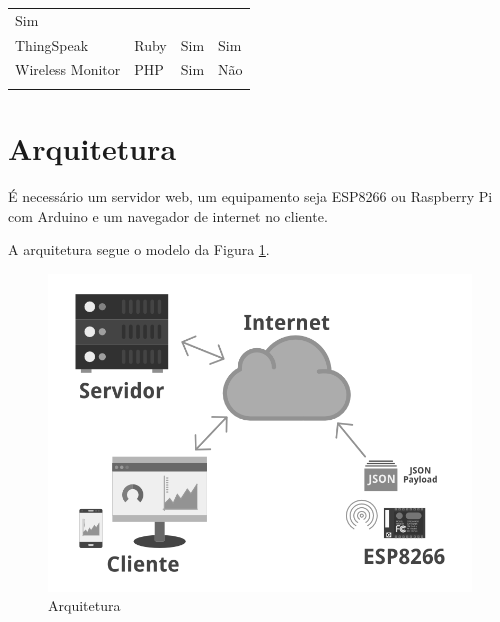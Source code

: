 \begin{longtable}[c]{@{}llll@{}}
\begin{minipage}[t]{0.12\columnwidth}
Sim
\end{minipage}
\\\addlinespace
\begin{minipage}[t]{0.22\columnwidth}\raggedright
ThingSpeak
\end{minipage} & \begin{minipage}[t]{0.28\columnwidth}\raggedright
Ruby
\end{minipage} & \begin{minipage}[t]{0.25\columnwidth}\raggedright
Sim
\end{minipage} & \begin{minipage}[t]{0.12\columnwidth}\raggedright
Sim
\end{minipage}
\\\addlinespace
\begin{minipage}[t]{0.22\columnwidth}\raggedright
Wireless Monitor
\end{minipage} & \begin{minipage}[t]{0.28\columnwidth}\raggedright
PHP
\end{minipage} & \begin{minipage}[t]{0.25\columnwidth}\raggedright
Sim
\end{minipage} & \begin{minipage}[t]{0.12\columnwidth}\raggedright
Não
\end{minipage}
\\\addlinespace
\bottomrule
\end{longtable}

\section{Arquitetura}\label{arquitetura}

É necessário um servidor web, um equipamento \iot seja ESP8266 ou
Raspberry Pi com Arduino e um navegador de internet no cliente.

A arquitetura segue o modelo da Figura \ref{fig:arquitetura}.

\begin{figure}[h]
    \centering
    \includegraphics[scale=0.5]{img/arquitetura-grey.png}
    \caption{Arquitetura} \label{fig:arquitetura}
\end{figure}

